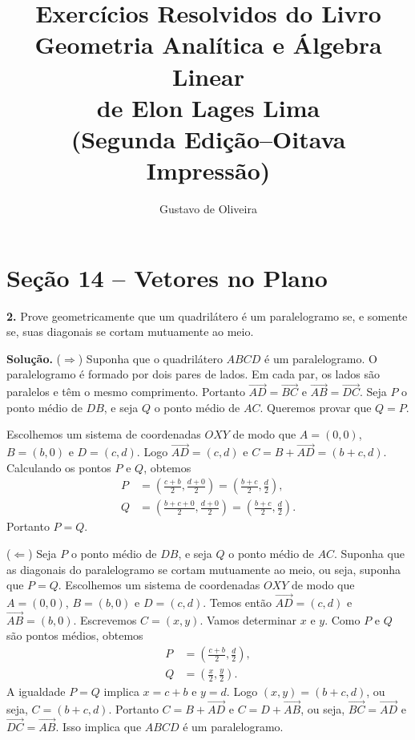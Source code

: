 \documentclass[a4paper,11pt]{article}
\title{Exercícios Resolvidos do Livro\\ Geometria Analítica e Álgebra Linear\\ de Elon Lages Lima\\ (Segunda Edição--Oitava Impressão)}
\author{Gustavo de Oliveira}
\begin{document}
\maketitle

\section{Seção 14 -- Vetores no Plano}

\textbf{2.}
Prove geometricamente que um quadrilátero é um paralelogramo se, e somente se, suas diagonais se cortam mutuamente ao meio.

\textbf{Solução.}
($\Rightarrow$)
Suponha que o quadrilátero $ABCD$ é um paralelogramo.
O paralelogramo é formado por dois pares de lados.
Em cada par, os lados são paralelos e têm o mesmo comprimento.
Portanto $\overrightarrow{AD} = \overrightarrow{BC}$ e $\overrightarrow{AB} = \overrightarrow{DC}$.
Seja $P$ o ponto médio de $DB$, e seja $Q$ o ponto médio de $AC$.
Queremos provar que $Q = P$.

Escolhemos um sistema de coordenadas $OXY$ de modo que $A = (0,0)$, $B = (b,0)$ e $D = (c, d)$.
Logo $\overrightarrow{AD} = (c,d)$ e $C = B + \overrightarrow{AD} = (b + c, d)$.
Calculando os pontos $P$ e $Q$, obtemos
\begin{align*}
  P & = \left( \frac{c+b}{2}, \frac{d+0}{2} \right) = \left( \frac{b+c}{2}, \frac{d}{2} \right), \\
  Q & = \left( \frac{b + c + 0}{2}, \frac{d+0}{2} \right) = \left( \frac{b+c}{2}, \frac{d}{2} \right).
\end{align*}
Portanto $P = Q$.

($\Leftarrow$)
Seja $P$ o ponto médio de $DB$, e seja $Q$ o ponto médio de $AC$.
Suponha que as diagonais do paralelogramo se cortam mutuamente ao meio, ou seja, suponha que $P = Q$.
Escolhemos um sistema de coordenadas $OXY$ de modo que $A = (0,0)$, $B = (b,0)$ e $D = (c, d)$.
Temos então $\overrightarrow{AD} = (c,d)$ e $\overrightarrow{AB} = (b,0)$.
Escrevemos $C = (x,y)$.
Vamos determinar $x$ e $y$.
Como $P$ e $Q$ são pontos médios, obtemos
\begin{align*}
  P & = \left( \frac{c+b}{2}, \frac{d}{2} \right), \\
  Q & = \left( \frac{x}{2}, \frac{y}{2} \right).
\end{align*}
A igualdade $P = Q$ implica $x = c + b$ e $y = d$.
Logo $(x,y) = (b + c, d)$, ou seja, $C = (b + c, d)$.
Portanto $C = B + \overrightarrow{AD}$ e $C = D + \overrightarrow{AB}$, ou seja, $\overrightarrow{BC} = \overrightarrow{AD}$ e $\overrightarrow{DC} = \overrightarrow{AB}$.
Isso implica que $ABCD$ é um paralelogramo.
\end{document}
